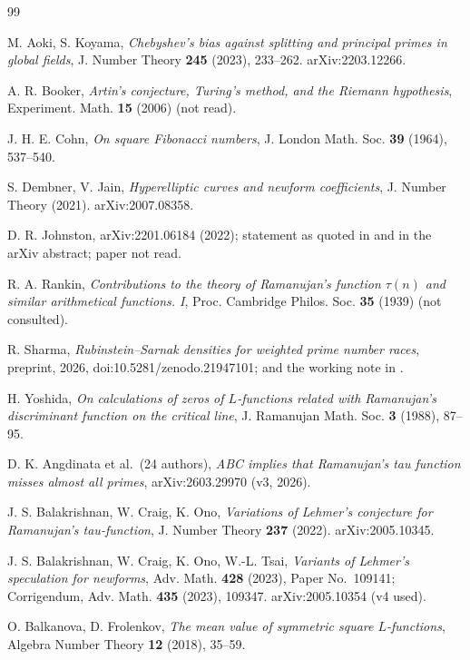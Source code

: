 \documentclass[11pt]{amsart}
\theoremstyle{definition}
\numberwithin{equation}{section}
\begin{document}
\begin{thebibliography}{99}\small

 M. Aoki, S. Koyama, \emph{Chebyshev's bias against splitting and principal primes in global fields}, J. Number Theory \textbf{245} (2023), 233--262. arXiv:2203.12266.

 A. R. Booker, \emph{Artin's conjecture, Turing's method, and the Riemann hypothesis}, Experiment. Math. \textbf{15} (2006) (not read).

 J. H. E. Cohn, \emph{On square Fibonacci numbers}, J. London Math. Soc. \textbf{39} (1964), 537--540.

 S. Dembner, V. Jain, \emph{Hyperelliptic curves and newform coefficients}, J. Number Theory (2021). arXiv:2007.08358.

 D. R. Johnston, arXiv:2201.06184 (2022); statement as quoted in \cite{Suzuki1} and in the arXiv abstract; paper not read.

 R. A. Rankin, \emph{Contributions to the theory of Ramanujan's function $\tau(n)$ and similar arithmetical functions. I}, Proc. Cambridge Philos. Soc. \textbf{35} (1939) (not consulted).

 R. Sharma, \emph{Rubinstein--Sarnak densities for weighted prime number races}, preprint, 2026, doi:10.5281/zenodo.21947101; and the working note  in \cite{Repo}.

 H. Yoshida, \emph{On calculations of zeros of $L$-functions related with Ramanujan's discriminant function on the critical line}, J. Ramanujan Math. Soc. \textbf{3} (1988), 87--95.

 D. K. Angdinata et al.\ (24 authors), \emph{ABC implies that Ramanujan's tau function misses almost all primes}, arXiv:2603.29970 (v3, 2026).

 J. S. Balakrishnan, W. Craig, K. Ono, \emph{Variations of Lehmer's conjecture for Ramanujan's tau-function}, J. Number Theory \textbf{237} (2022). arXiv:2005.10345.

 J. S. Balakrishnan, W. Craig, K. Ono, W.-L. Tsai, \emph{Variants of Lehmer's speculation for newforms}, Adv. Math. \textbf{428} (2023), Paper No.~109141; Corrigendum, Adv. Math. \textbf{435} (2023), 109347. arXiv:2005.10354 (v4 used).

 O. Balkanova, D. Frolenkov, \emph{The mean value of symmetric square $L$-functions}, Algebra Number Theory \textbf{12} (2018), 35--59.


\end{thebibliography}
\end{document}
